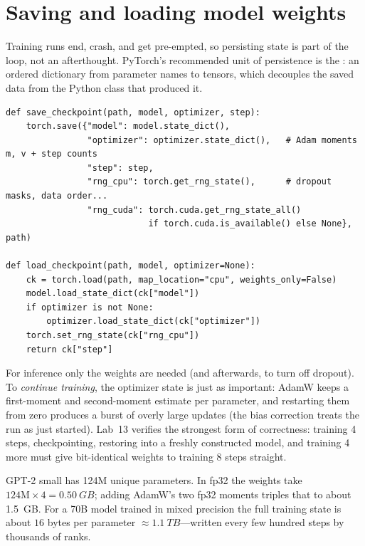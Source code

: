 \section{Saving and loading model weights}\label{sec:pretrain:save}

Training runs end, crash, and get pre-empted, so persisting state is part of the loop, not an
afterthought. PyTorch's recommended unit of persistence is the : an ordered
dictionary from parameter names to tensors, which decouples the saved data from the Python
class that produced it.

\begin{lstlisting}[caption={Saving and restoring \emph{all} training state (Lab 13, Task 5).},label={lst:pretrain:ckpt}]
def save_checkpoint(path, model, optimizer, step):
    torch.save({"model": model.state_dict(),
                "optimizer": optimizer.state_dict(),   # Adam moments m, v + step counts
                "step": step,
                "rng_cpu": torch.get_rng_state(),      # dropout masks, data order...
                "rng_cuda": torch.cuda.get_rng_state_all()
                            if torch.cuda.is_available() else None}, path)

def load_checkpoint(path, model, optimizer=None):
    ck = torch.load(path, map_location="cpu", weights_only=False)
    model.load_state_dict(ck["model"])
    if optimizer is not None:
        optimizer.load_state_dict(ck["optimizer"])
    torch.set_rng_state(ck["rng_cpu"])
    return ck["step"]
\end{lstlisting}

For inference only the weights are needed (and  afterwards, to turn off
dropout). To \emph{continue training}, the optimizer state is just as important: AdamW keeps a
first-moment and second-moment estimate per parameter, and restarting them from zero produces
a burst of overly large updates (the bias correction treats the run as just started). Lab~13
verifies the strongest form of correctness: training 4 steps, checkpointing, restoring into a
freshly constructed model, and training 4 more must give bit-identical weights to training 8
steps straight.

\begin{napkinmath}
GPT-2 small has 124M unique parameters. In fp32 the weights take $124\text{M}\times 4 =
\SI{0.50}{GB}$; adding AdamW's two fp32 moments triples that to about \SI{1.5}{GB}. For a 70B
model trained in mixed precision the full training state is about $16$ bytes per parameter
$\approx \SI{1.1}{TB}$---written every few hundred steps by thousands of ranks.
\end{napkinmath}

